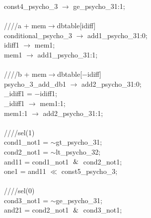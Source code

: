 {   \hspace*{2em}const4\_psycho\_3 $\rightarrow$ ge\_psycho\_31:1; \\
   \\
   \hspace*{2em}////a + mem$\rightarrow$dbtable[idiff] \\
   \hspace*{2em}conditional\_psycho\_3 $\rightarrow$ add1\_psycho\_31:0; \\
   \hspace*{2em}idiff1 $\rightarrow$ mem1; \\
   \hspace*{2em}mem1 $\rightarrow$ add1\_psycho\_31:1; \\
   \\
   \hspace*{2em}////b + mem$\rightarrow$dbtable[$-$idiff] \\
   \hspace*{2em}psycho\_3\_add\_db1 $\rightarrow$ add2\_psycho\_31:0; \\
   \hspace*{2em}\_idiff1 = $-$idiff1; \\
   \hspace*{2em}\_idiff1 $\rightarrow$ mem1:1; \\
   \hspace*{2em}mem1:1 $\rightarrow$ add2\_psycho\_31:1; \\
   \\
   \hspace*{2em}////sel(1) \\
   \hspace*{2em}cond1\_not1 = $\sim$gt\_psycho\_31; \\
   \hspace*{2em}cond2\_not1 = $\sim$lt\_psycho\_32; \\
   \hspace*{2em}and11 = cond1\_not1 $\And$ cond2\_not1; \\
   \hspace*{2em}one1 = and11 $\ll$ const5\_psycho\_3; \\
   \\
   \hspace*{2em}////sel(0) \\
   \hspace*{2em}cond3\_not1 = $\sim$ge\_psycho\_31; \\
   \hspace*{2em}and21 = cond2\_not1 $\And$ cond3\_not1; \\
}
